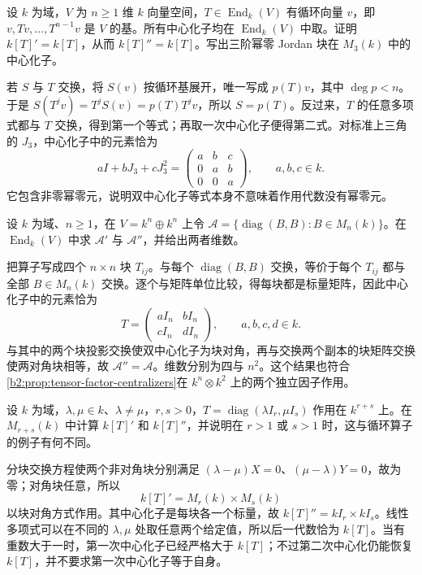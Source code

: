 \begin{exercise}\label{b2:ex:11-cyclic-operator-centralizer}
	设 \(k\) 为域，\(V\) 为 \(n\ge1\) 维 \(k\) 向量空间，\(T\in\operatorname{End}_k(V)\) 有循环向量 \(v\)，即 \(v,Tv,\ldots,T^{n-1}v\) 是 \(V\) 的基。所有中心化子均在 \(\operatorname{End}_k(V)\) 中取。证明 \(k[T]'=k[T]\)，从而 \(k[T]''=k[T]\)。写出三阶幂零 Jordan 块在 \(M_3(k)\) 中的中心化子。
\end{exercise}
\begin{solution}
	若 \(S\) 与 \(T\) 交换，将 \(S(v)\) 按循环基展开，唯一写成 \(p(T)v\)，其中 \(\deg p<n\)。于是 \(S(T^jv)=T^jS(v)=p(T)T^jv\)，所以 \(S=p(T)\)。反过来，\(T\) 的任意多项式都与 \(T\) 交换，得到第一个等式；再取一次中心化子便得第二式。对标准上三角的 \(J_3\)，中心化子中的元素恰为
	\[
		aI+bJ_3+cJ_3^2
		=\begin{pmatrix}a&b&c\\0&a&b\\0&0&a\end{pmatrix},\qquad a,b,c\in k.
	\]
	它包含非零幂零元，说明双中心化子等式本身不意味着作用代数没有幂零元。
\end{solution}

\begin{exercise}\label{b2:ex:11-repeated-matrix-blocks}
	设 \(k\) 为域、\(n\ge1\)，在 \(V=k^n\oplus k^n\) 上令 \(\mathcal A=\bigl\{\operatorname{diag}(B,B):B\in M_n(k)\bigr\}\)。在 \(\operatorname{End}_k(V)\) 中求 \(\mathcal A'\) 与 \(\mathcal A''\)，并给出两者维数。
\end{exercise}
\begin{solution}
	把算子写成四个 \(n\times n\) 块 \(T_{ij}\)。与每个 \(\operatorname{diag}(B,B)\) 交换，等价于每个 \(T_{ij}\) 都与全部 \(B\in M_n(k)\) 交换。逐个与矩阵单位比较，得每块都是标量矩阵，因此中心化子中的元素恰为
	\[
		T=\begin{pmatrix}aI_n&bI_n\\cI_n&dI_n\end{pmatrix},\qquad a,b,c,d\in k.
	\]
	与其中的两个块投影交换使双中心化子为块对角，再与交换两个副本的块矩阵交换使两对角块相等，故 \(\mathcal A''=\mathcal A\)。维数分别为四与 \(n^2\)。这个结果也符合\cref{b2:prop:tensor-factor-centralizers}在 \(k^n\otimes k^2\) 上的两个独立因子作用。
\end{solution}

\begin{exercise}\label{b2:ex:11-two-eigenvalue-blocks}
	设 \(k\) 为域，\(\lambda,\mu\in k\)、\(\lambda\ne\mu\)，\(r,s>0\)，\(T=\operatorname{diag}(\lambda I_r,\mu I_s)\) 作用在 \(k^{r+s}\) 上。在 \(M_{r+s}(k)\) 中计算 \(k[T]'\) 和 \(k[T]''\)，并说明在 \(r>1\) 或 \(s>1\) 时，这与循环算子的例子有何不同。
\end{exercise}
\begin{solution}
	分块交换方程使两个非对角块分别满足 \((\lambda-\mu)X=0\)、\((\mu-\lambda)Y=0\)，故为零；对角块任意，所以
	\[
		k[T]'=M_r(k)\times M_s(k)
	\]
	以块对角方式作用。其中心化子是每块各一个标量，故 \(k[T]''=kI_r\times kI_s\)。线性多项式可以在不同的 \(\lambda,\mu\) 处取任意两个给定值，所以后一代数恰为 \(k[T]\)。当有重数大于一时，第一次中心化子已经严格大于 \(k[T]\)；不过第二次中心化仍能恢复 \(k[T]\)，并不要求第一次中心化子等于自身。
\end{solution}


